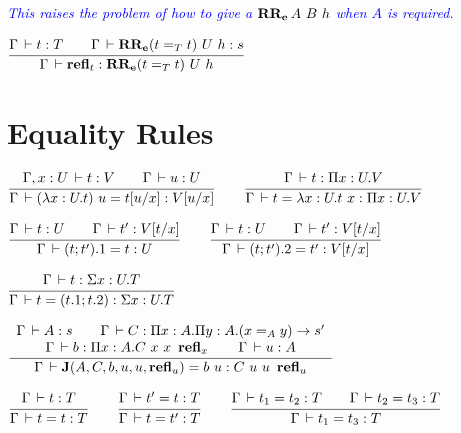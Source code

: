 \documentclass[a4paper,english]{lipics-utf8x}
\newcommand\meta[1]{\noindent\textcolor{blue}{\emph{#1}}}
\begin{document}
  \meta{This raises the problem of how to give a $\operatorname{\mathbf{RR_e}}A\ B\ h$ when $A$ is
  required.}

  \begin{center}
  \(
    \ru{\Gamma \der t : T \qquad
        \Gamma \der \RRe{(t =_T t)}{U}{h} : s
      }{\Gamma \der \refl_t : \RRe{(t =_T t)}{U}{h}}
  \)
  \end{center}

  \section{Equality Rules}


  \begin{center}
  \(
    \ru{\Gamma, x:U \der t:V \qquad
        \Gamma \der u : U
      }{\Gamma \der (\lambda x:U.t)~u = t[u/x] : V[u/x]}
    \qquad
    \ru{\Gamma \der t : \Pi x:U.V
      }{\Gamma \der t = \lambda x:U.t~x : \Pi x:U.V}
  \)
  \end{center}

  \begin{center}
  \(
    \ru{\Gamma \der t : U \qquad
        \Gamma \der t' : V[t/x]
      }{\Gamma \der (t;t').1 = t : U}
    \qquad
    \ru{\Gamma \der t : U \qquad
        \Gamma \der t' : V[t/x]
      }{\Gamma \der (t;t').2 = t' : V[t/x]}
  \)
  \end{center}

  \begin{center}
  \(
    \ru{\Gamma \der t : \Sigma x:U.T
      }{\Gamma \der t = (t.1 ; t.2) : \Sigma x:U.T}
  \)
  \end{center}

  \begin{center}
  \(
    \dru{\Gamma \der A : s \qquad
         \Gamma \der C : \Pi x:A. \Pi y:A. (x =_A y) \to s'
       }{\Gamma \der b : \Pi x:A. C\ x\ x\ \refl_x \qquad
         \Gamma \der u : A
       }{\Gamma \der \J (A,C,b,u,u,\refl_u) = b\ u : C\ u\ u\ \refl_u}
  \)
  \end{center}


  \begin{center}
  \(
    \ru{\Gamma \der t : T
      }{\Gamma \der t = t : T}
    \qquad
    \ru{\Gamma \der t' = t : T
      }{\Gamma \der t = t' : T}
    \qquad
    \ru{\Gamma \der t_1 = t_2 : T \qquad
        \Gamma \der t_2 = t_3 : T
      }{\Gamma \der t_1 = t_3 : T}
  \)
  \end{center}
\end{document}
